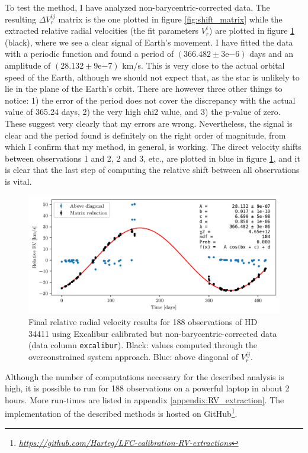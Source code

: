     To test the method, I have analyzed non-barycentric-corrected data. The resulting $\Delta V_r^{ij}$ matrix is the one plotted in figure \ref{fig:shift_matrix} while the extracted relative radial velocities (the fit parameters $V_r^i$) are plotted in figure \ref{fig:RV_results_non_barycentric} (black), where we see a clear signal of Earth's movement. I have fitted the data with a periodic function and found a  period of $(366.482 \pm 3\mathrm{e}{-6})$ days and an amplitude of $(28.132 \pm 9\mathrm{e}{-7})$ km/s. This is very close to the actual orbital speed of the Earth, although we should not expect that, as the star is unlikely to lie in the plane of the Earth's orbit. There are however three other things to notice: 1) the error of the period does not cover the discrepancy with the actual value of 365.24 days, 2) the very high chi2 value, and 3) the p-value of zero. These suggest very clearly that my errors are wrong. Nevertheless, the signal is clear and the period found is definitely on the right order of magnitude, from which I confirm that my method, in general, is working. The direct velocity shifts between observations 1 and 2, 2 and 3, etc.,  are plotted in blue in figure \ref{fig:RV_results_non_barycentric}, and it is clear that the last step of computing the relative shift between all observations is vital.

    \begin{figure}%
        \begin{wide}  
            \includegraphics[width=\textwidth]{figures/shift_non_bary_centric.pdf}
            \caption{Final relative radial velocity results for 188 observations of HD 34411 using Excalibur calibrated but non-barycentric-corrected data (data column \texttt{excalibur}). Black: values computed through the overconstrained system approach. Blue: above diagonal of $V_r^{ij}$.}
            \label{fig:RV_results_non_barycentric}
        \end{wide}
    \end{figure}


    Although the number of computations necessary for the described analysis is high, it is possible to run for 188 observations on a powerful laptop in about 2 hours. More run-times are listed in appendix \ref{appendix:RV_extraction}. The implementation of the described methods is hosted on GitHub\footnote{\href{https://github.com/Harteg/LFC-calibration-RV-extractions}{\textit{https://github.com/Harteg/LFC-calibration-RV-extractions}}}. 

    
    

